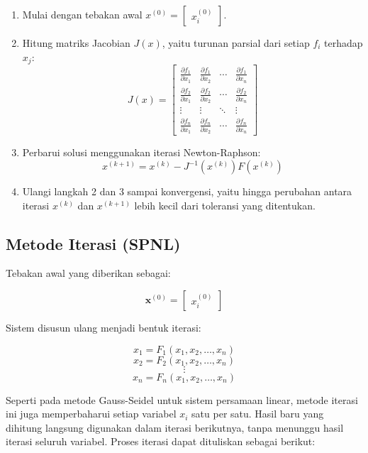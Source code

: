 \documentclass[a4paper,extrafontsizes, 9pt]{memoir}
\begin{document}
\begin{multicols}{3}
        \begin{enumerate}
            \item Mulai dengan tebakan awal \(x^{(0)} = \begin{bmatrix} x_i^{(0)} \end{bmatrix}\).
            \item Hitung matriks Jacobian \(J(x)\), yaitu turunan parsial dari setiap \(f_i\) terhadap \(x_j\):
            \[
            J(x) = \begin{bmatrix} 
            \frac{\partial f_1}{\partial x_1} & \frac{\partial f_1}{\partial x_2} & \cdots & \frac{\partial f_1}{\partial x_n} \\
            \frac{\partial f_2}{\partial x_1} & \frac{\partial f_2}{\partial x_2} & \cdots & \frac{\partial f_2}{\partial x_n} \\
            \vdots & \vdots & \ddots & \vdots \\
            \frac{\partial f_n}{\partial x_1} & \frac{\partial f_n}{\partial x_2} & \cdots & \frac{\partial f_n}{\partial x_n}
            \end{bmatrix}
            \]
            \item Perbarui solusi menggunakan iterasi Newton-Raphson:
            \[
            x^{(k+1)} = x^{(k)} - J^{-1}(x^{(k)}) F(x^{(k)})
            \]
            \item Ulangi langkah 2 dan 3 sampai konvergensi, yaitu hingga perubahan antara iterasi \(x^{(k)}\) dan \(x^{(k+1)}\) lebih kecil dari toleransi yang ditentukan.
      \end{enumerate}  
      \subsection*{\small Metode Iterasi (SPNL)}
Tebakan awal yang diberikan sebagai:

\[
\mathbf{x}^{(0)} = \begin{bmatrix} x_i^{(0)} \end{bmatrix}
\]

Sistem disusun ulang menjadi bentuk iterasi:

\[
x_1 = F_1(x_1, x_2, \dots, x_n)
\]
\[
x_2 = F_2(x_1, x_2, \dots, x_n)
\]
\[
\vdots
\]
\[
x_n = F_n(x_1, x_2, \dots, x_n)
\]

Seperti pada metode Gauss-Seidel untuk sistem persamaan linear, metode iterasi ini juga memperbaharui setiap variabel \( x_i \) satu per satu. Hasil baru yang dihitung langsung digunakan dalam iterasi berikutnya, tanpa menunggu hasil iterasi seluruh variabel. Proses iterasi dapat dituliskan sebagai berikut:


\end{multicols}
\end{document}
